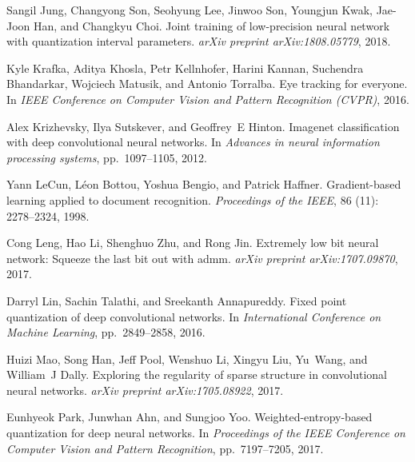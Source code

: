 \documentclass{article} %
\begin{document}
\begin{thebibliography}{36}
Sangil Jung, Changyong Son, Seohyung Lee, Jinwoo Son, Youngjun Kwak, Jae-Joon
  Han, and Changkyu Choi.
\newblock Joint training of low-precision neural network with quantization
  interval parameters.
\newblock \emph{arXiv preprint arXiv:1808.05779}, 2018.

Kyle Krafka, Aditya Khosla, Petr Kellnhofer, Harini Kannan, Suchendra
  Bhandarkar, Wojciech Matusik, and Antonio Torralba.
\newblock Eye tracking for everyone.
\newblock In \emph{IEEE Conference on Computer Vision and Pattern Recognition
  (CVPR)}, 2016.

Alex Krizhevsky, Ilya Sutskever, and Geoffrey~E Hinton.
\newblock Imagenet classification with deep convolutional neural networks.
\newblock In \emph{Advances in neural information processing systems}, pp.\  1097--1105, 2012.

Yann LeCun, L{\'e}on Bottou, Yoshua Bengio, and Patrick Haffner.
\newblock Gradient-based learning applied to document recognition.
\newblock \emph{Proceedings of the IEEE}, 86 (11):
  2278--2324, 1998.

Cong Leng, Hao Li, Shenghuo Zhu, and Rong Jin.
\newblock Extremely low bit neural network: Squeeze the last bit out with admm.
\newblock \emph{arXiv preprint arXiv:1707.09870}, 2017.

Darryl Lin, Sachin Talathi, and Sreekanth Annapureddy.
\newblock Fixed point quantization of deep convolutional networks.
\newblock In \emph{International Conference on Machine Learning}, pp.\  2849--2858, 2016.

Huizi Mao, Song Han, Jeff Pool, Wenshuo Li, Xingyu Liu, Yu~Wang, and William~J
  Dally.
\newblock Exploring the regularity of sparse structure in convolutional neural
  networks.
\newblock \emph{arXiv preprint arXiv:1705.08922}, 2017.

Eunhyeok Park, Junwhan Ahn, and Sungjoo Yoo.
\newblock Weighted-entropy-based quantization for deep neural networks.
\newblock In \emph{Proceedings of the IEEE Conference on Computer Vision and
  Pattern Recognition}, pp.\ 7197--7205, 2017.


\end{thebibliography}
\end{document}

